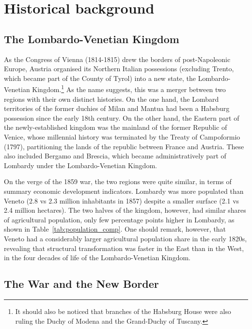 \section{Historical background}

\subsection{The Lombardo-Venetian Kingdom}
As the Congress of Vienna (1814-1815) drew the borders of post-Napoleonic Europe, Austria organised its Northern Italian possessions (excluding Trento, which became part of the County of Tyrol) into a new state, the Lombardo-Venetian Kingdom.\footnote{It should also be noticed that branches of the Habsburg House were also ruling the Duchy of Modena and the Grand-Duchy of Tuscany.}
As the name suggests, this was a merger between two  regions with their own distinct histories. 
On the one hand, the Lombard territories of the former duchies of Milan and Mantua had been a Habsburg possession since the early 18th century. 
On the other hand, the Eastern part of the newly-established kingdom was the mainland of the former Republic of Venice, whose millennial history was terminated by the Treaty of Campoformio (1797), partitioning the lands of the republic between France and Austria. 
These also included Bergamo and Brescia, which became administratively part of Lombardy under the Lombardo-Venetian Kingdom.

On the verge of the 1859 war, the two regions were quite similar, in terms of summary economic development indicators. Lombardy was more populated than Veneto (2.8 vs 2.3 million inhabitants in 1857) despite a smaller surface (2.1 vs 2.4 million hectares). The two halves of the kingdom, however, had similar shares of agricultural population, only few percentage points higher in Lombardy, as shown in Table~\ref{tab:population_comp}. One should remark, however, that Veneto had a considerably larger agricultural population share in the early 1820s, revealing that structural transformation was faster in the East than in the West, in the four decades of life of the Lombardo-Venetian Kingdom.  




\subsection{The War and the New Border}


